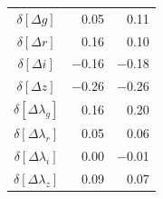 \documentclass[a4paper,fleqn,usenatbib]{emulateapj}
\begin{document}
\begin{table}
\begin{tabular}{c|rr}
		$\delta [ \Delta g ]$ &    0.05 &      0.11     \\
		$\delta [ \Delta r ]$ &    0.16 &      0.10     \\
		$\delta [ \Delta i ]$ &   $-$0.16 &     $-$0.18     \\
		$\delta [ \Delta z ]$ &   $-$0.26 &     $-$0.26     \\
		$\delta [ \Delta \lambda_g ]$ &    0.16 &      0.20     \\
		$\delta [ \Delta \lambda_r ]$ &    0.05 &      0.06     \\
		$\delta [ \Delta \lambda_i ]$ &    0.00 &     $-$0.01     \\
		$\delta [ \Delta \lambda_z ]$ &    0.09 &      0.07     \\
		\hline
	\end{tabular}
\end{table}
\end{document}
